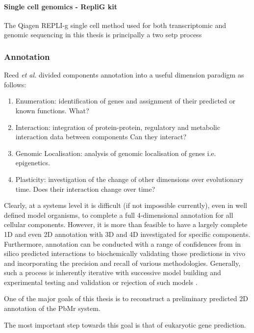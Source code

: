 \paragraph{Single cell genomics - RepliG kit}
The Qiagen REPLI-g single cell method used for both transcriptomic and genomic
sequencing in this thesis is principally a two setp process



\subsubsection{Annotation}

Reed \textit{et al.} \citep{Reed2006} divided components annotation into a useful dimension paradigm as follows:
\begin{enumerate}
    \item Enumeration: identification of genes and assignment of their predicted or known functions. What?
    \item Interaction: integration of protein-protein, regulatory and metabolic interaction data between components Can they interact?
    \item Genomic Localisation: analysis of genomic localisation of genes i.e. epigenetics.
    \item Plasticity: investigation of the change of other dimensions over evolutionary time. Does their interaction change over time? \citep{Reed2006} 
\end{enumerate}

Clearly, at a systems level it is difficult (if not impossible currently), 
even in well defined model organisms, to complete a full 4-dimensional annotation 
for all cellular components. However, it is more than feasible to have a largely
complete 1D and even 2D annotation with 3D and 4D investigated for specific 
components.  Furthermore, annotation can be conducted with a range of confidences
from in silico predicted interactions to biochemically validating those predictions in vivo
and incorporating the precision and recall of various methodologies. Generally, such a process
is inherently iterative with successive model building and experimental testing and validation 
or rejection of such models \citep{Reed2006}.

One of the major goals of this thesis is to reconstruct a preliminary predicted
2D annotation of the PbMr system.

The most important step towards this goal is that of eukaryotic gene prediction.


